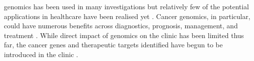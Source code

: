 \Glspl{genomic} has been used in many investigations \citep{Goodwin2016} but relatively few of the potential applications in healthcare have been realised yet \citep{Roychowdhury2016, Tran2012}. Cancer \glspl{genomic}, in particular, could have numerous benefits across diagnostics, prognosis, management, and treatment \citep{Roychowdhury2016}. %
While direct impact of \glspl{genomic} on the clinic has been limited thus far, the \glspl{cancer gene} and therapeutic targets identified have begun to be introduced in the clinic \citep{Stratton2009}.



